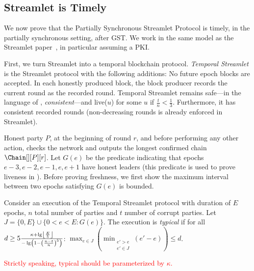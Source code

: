 \subsection{Streamlet is Timely}

We now prove that the Partially Synchronous Streamlet Protocol is timely,
in the partially synchronous setting, after GST.
We work in the same model as the Streamlet paper~\cite{streamlet},
in particular assuming a PKI.

First, we turn Streamlet into a temporal blockchain protocol.
\emph{Temporal Streamlet} is the Streamlet protocol with the
following additions: No future epoch blocks are accepted. In each honestly produced block, the block producer
records the current round as the recorded round.
Temporal Streamlet remains safe---in the language of \cite{streamlet}, \emph{consistent}---and live($u$) for some $u$
if $\frac{t}{n} < \frac{1}{3}$. Furthermore, it has consistent recorded rounds (non-decreasing rounds is already enforced in Streamlet).

Honest party $P$, at the beginning of round $r$, and
before performing any other action, checks the network and
outputs the longest confirmed chain $\Chain[][P][r]$.
Let $G(e)$ be the predicate indicating that epochs $e-3,e-2,e-1,e,e+1$ have honest leaders (this predicate is used to prove liveness in \cite{streamlet}).
Before proving freshness, we first show the maximum interval between two epochs satisfying $G(e)$ is bounded.

\begin{definition}
  Consider an execution of the Temporal Streamlet protocol with duration
  of $E$ epochs, $n$ total number of parties and $t$ number of corrupt parties.
  Let $J = \{0,E\} \cup \{0 < e < E: G(e)\}$.
  The execution is \emph{typical} if for all
  $d \geq 5\frac{\kappa + \lg \floor*{\frac{E}{5}}}{- \lg \left(1 - \left(\frac{n - t}{n}\right)^5\right)}$:
  $\max_{e \in J}(\min_{\substack{e' > e \\ e' \in J}}(e' - e)) \leq d$.
\end{definition}

\textcolor{red}{Strictly speaking, typical should be parameterized by $\kappa$.}

